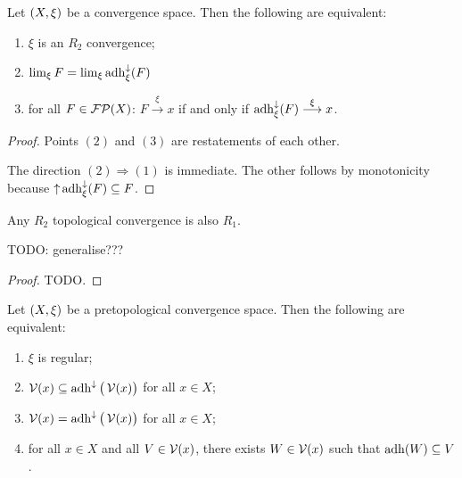 \begin{lemma}
Let $\sSet{X,\xi}$ be a convergence space. Then the following are equivalent:
\begin{enumerate}
\item $\xi$ is an $R_2$ convergence;
\item $\lim_\xi F = \lim_\xi \operatorname{adh}_\xi^\downarrow(F)$
\item for all $F\in\operatorname{\mathcal{FP}}(X)$: $F\overset{\xi}{\longrightarrow} x$ \textup{if and only if} $\operatorname{adh}_\xi^\downarrow(F) \overset{\xi}{\longrightarrow} x$.
\end{enumerate}
\end{lemma}
\begin{proof}
Points $(2)$ and $(3)$ are restatements of each other.

The direction $(2)\Rightarrow (1)$ is immediate. The other follows by monotonicity because $\operatorname{\uparrow} \operatorname{adh}_\xi^\downarrow(F) \subseteq F$.
\end{proof}

\begin{proposition}
Any $R_2$ topological convergence is also $R_1$.
\end{proposition}
TODO: generalise???
\begin{proof}
TODO.
\end{proof}

\begin{lemma}
Let $\sSet{X, \xi}$ be a pretopological convergence space. Then the following are equivalent:
\begin{enumerate}
\item $\xi$ is regular;
\item $\operatorname{\mathcal{V}}(x) \subseteq \operatorname{adh}^\downarrow\big(\operatorname{\mathcal{V}}(x)\big)$ for all $x\in X$;
\item $\operatorname{\mathcal{V}}(x) = \operatorname{adh}^\downarrow\big(\operatorname{\mathcal{V}}(x)\big)$ for all $x\in X$;
\item for all $x\in X$ and all $V\in \operatorname{\mathcal{V}}(x)$, there exists $W\in \operatorname{\mathcal{V}}(x)$ such that $\operatorname{adh}(W) \subseteq V$.
\end{enumerate}
\end{lemma}


